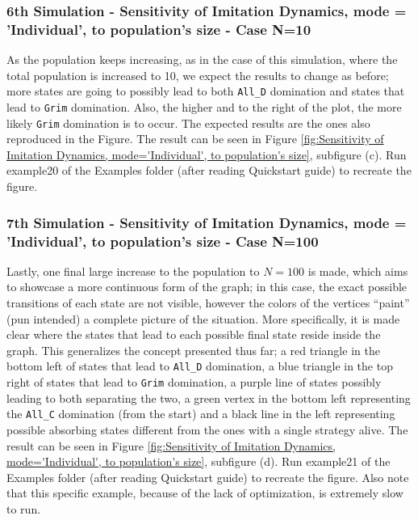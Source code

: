 \subsubsection{6th Simulation - Sensitivity of Imitation Dynamics, mode = 'Individual', to population's size - Case N=10}
As the population keeps increasing, as in the case of this simulation, where the total population is increased to 10, we expect the results to change as before; more states are going to possibly lead to both \texttt{All\_D} domination and states that lead to \texttt{Grim} domination. Also, the higher and to the right of the plot, the more likely \texttt{Grim} domination is to occur. The expected results are the ones also reproduced in the Figure. The result can be seen in Figure \ref{fig:Sensitivity of Imitation Dynamics, mode='Individual', to population's size}, subfigure (c). Run example20 of the Examples folder (after reading Quickstart guide) to recreate the figure.

\subsubsection{7th Simulation - Sensitivity of Imitation Dynamics, mode = 'Individual', to population's size - Case N=100}
Lastly, one final large increase to the population to $N=100$ is made, which aims to showcase a more continuous form of the graph; in this case, the exact possible transitions of each state are not visible, however the colors of the vertices ``paint'' (pun intended) a complete picture of the situation. More specifically, it is made clear where the states that lead to each possible final state reside inside the graph. This generalizes the concept presented thus far; a red triangle in the bottom left of states that lead to \texttt{All\_D} domination, a blue triangle in the top right of states that lead to \texttt{Grim} domination, a purple line of states possibly leading to both separating the two, a green vertex in the bottom left representing the \texttt{All\_C} domination (from the start) and a black line in the left representing possible absorbing states different from the ones with a single strategy alive. The result can be seen in Figure \ref{fig:Sensitivity of Imitation Dynamics, mode='Individual', to population's size}, subfigure (d). Run example21 of the Examples folder (after reading Quickstart guide) to recreate the figure. Also note that this specific example, because of the lack of optimization, is extremely slow to run.

